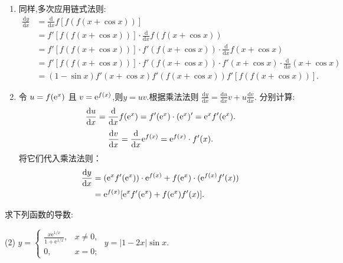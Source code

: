 \begin{solution}
\begin{enumerate}
        \item 同样,多次应用链式法则:
              \begin{align*}
                  \frac{\mathrm{d}y}{\mathrm{d}x} & = \frac{\mathrm{d}}{\mathrm{d}x} f[f(f(x+\cos x))]                                                            \\
                                                  & = f'[f(f(x+\cos x))] \cdot \frac{\mathrm{d}}{\mathrm{d}x} f(f(x+\cos x))                                      \\
                                                  & = f'[f(f(x+\cos x))] \cdot f'(f(x+\cos x)) \cdot \frac{\mathrm{d}}{\mathrm{d}x} f(x+\cos x)                   \\
                                                  & = f'[f(f(x+\cos x))] \cdot f'(f(x+\cos x)) \cdot f'(x+\cos x) \cdot \frac{\mathrm{d}}{\mathrm{d}x} (x+\cos x) \\
                                                  & = (1-\sin x) f'(x+\cos x) f'(f(x+\cos x)) f'[f(f(x+\cos x))].
              \end{align*}

        \item 令 $u = f(\mathrm{e}^x)$ 且 $v = \mathrm{e}^{f(x)}$,则$y=uv$.根据乘法法则 $\frac{\mathrm{d}y}{\mathrm{d}x} = \frac{\mathrm{d}u}{\mathrm{d}x}v + u\frac{\mathrm{d}v}{\mathrm{d}x}$.
              分别计算:
              $$ \frac{\mathrm{d}u}{\mathrm{d}x} = \frac{\mathrm{d}}{\mathrm{d}x} f(\mathrm{e}^x) = f'(\mathrm{e}^x) \cdot (\mathrm{e}^x)' = \mathrm{e}^x f'(\mathrm{e}^x). $$
              $$ \frac{\mathrm{d}v}{\mathrm{d}x} = \frac{\mathrm{d}}{\mathrm{d}x} \mathrm{e}^{f(x)} = \mathrm{e}^{f(x)} \cdot f'(x). $$
              将它们代入乘法法则：
              \begin{align*}
                  \frac{\mathrm{d}y}{\mathrm{d}x} & = (\mathrm{e}^x f'(\mathrm{e}^x)) \cdot \mathrm{e}^{f(x)} + f(\mathrm{e}^x) \cdot (\mathrm{e}^{f(x)} f'(x)) \\
                                                  & = \mathrm{e}^{f(x)} [\mathrm{e}^x f'(\mathrm{e}^x) + f(\mathrm{e}^x) f'(x)].
              \end{align*}
    \end{enumerate}
\end{solution}

\begin{exercise}[3.1.11]
    求下列函数的导数:
    \begin{tasks}[label=(\arabic*)](2)
        \task $y = \begin{cases} \frac{x\mathrm{e}^{1/x} }{1+ \mathrm{e}^{1/x}}, & x \ne 0, \\ 0, & x=0; \end{cases}$
        \task $y = |1-2x|\sin x$.
    \end{tasks}
\end{exercise}

